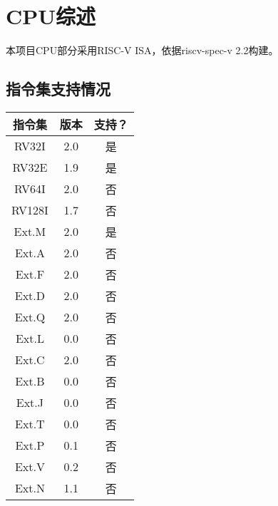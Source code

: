 %
%
%
%
%
%
%
%

\chapter{CPU综述}
本项目CPU部分采用RISC-V ISA，依据riscv-spec-v 2.2构建。
\section{指令集支持情况}
\begin{tabular}{|c|c|c|}
    \hline
    指令集  &   版本    &   支持？\\\hline
    RV32I   &   2.0 &   是\\\hline
    RV32E   &   1.9 &   是\\\hline
    RV64I   &   2.0 &   否\\\hline
    RV128I  &   1.7 &   否\\\hline
    Ext.M   &   2.0 &   是\\\hline
    Ext.A   &   2.0 &   否\\\hline
    Ext.F   &   2.0 &   否\\\hline
    Ext.D   &   2.0 &   否\\\hline
    Ext.Q   &   2.0 &   否\\\hline
    Ext.L   &   0.0 &   否\\\hline
    Ext.C   &   2.0 &   否\\\hline
    Ext.B   &   0.0 &   否\\\hline
    Ext.J   &   0.0 &   否\\\hline
    Ext.T   &   0.0 &   否\\\hline
    Ext.P   &   0.1 &   否\\\hline
    Ext.V   &   0.2 &   否\\\hline
    Ext.N   &   1.1 &   否\\\hline
\end{tabular}
